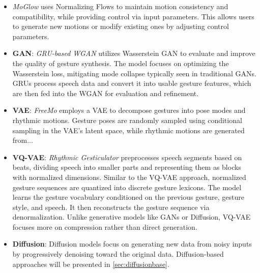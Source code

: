 \begin{itemize}
	\item \textit{MoGlow} \citep{henter2020moglow} uses Normalizing Flows to maintain motion consistency and compatibility, while providing control via input parameters. This allows users to generate new motions or modify existing ones by adjusting control parameters.
	
	\item \textbf{GAN}: \textit{GRU-based WGAN} \citep{wu2021probabilistic} utilizes Wasserstein GAN to evaluate and improve the quality of gesture synthesis. The model focuses on optimizing the Wasserstein loss, mitigating mode collapse typically seen in traditional GANs. GRUs process speech data and convert it into usable gesture features, which are then fed into the WGAN for evaluation and refinement.
	
	\item \textbf{VAE}: \textit{FreeMo} \citep{xu2022freeform} employs a VAE to decompose gestures into pose modes and rhythmic motions. Gesture poses are randomly sampled using conditional sampling in the VAE's latent space, while rhythmic motions are generated from...
	
	\item \textbf{VQ-VAE}: \textit{Rhythmic Gesticulator} \citep{ao2022rhythmic} preprocesses speech segments based on beats, dividing speech into smaller parts and representing them as blocks with normalized dimensions. Similar to the VQ-VAE approach, normalized gesture sequences are quantized into discrete gesture lexicons. The model learns the gesture vocabulary conditioned on the previous gesture, gesture style, and speech. It then reconstructs the gesture sequence via denormalization. Unlike generative models like GANs or Diffusion, VQ-VAE focuses more on compression rather than direct generation.
	
	\item \textbf{Diffusion}: Diffusion models focus on generating new data from noisy inputs by progressively denoising toward the original data. Diffusion-based approaches will be presented in \autoref{sec:diffusionbase}.
\end{itemize}



